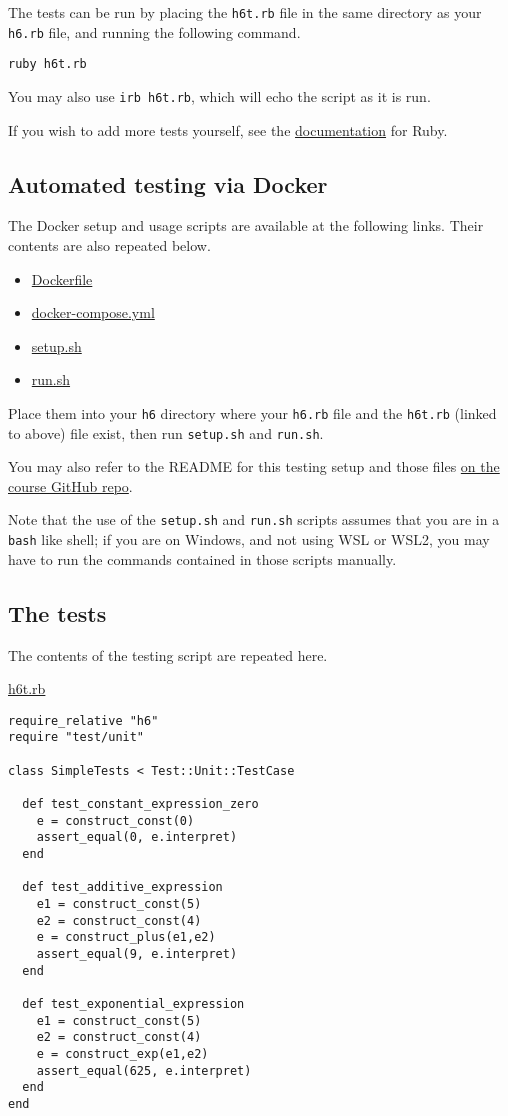 \documentclass[11pt]{article}
\begin{document}
The tests can be run by placing the \texttt{h6t.rb} file
in the same directory as your \texttt{h6.rb} file, and
running the following command.
\begin{verbatim}
ruby h6t.rb
\end{verbatim}
You may also use \texttt{irb h6t.rb}, which will echo the script
as it is run.

If you wish to add more tests yourself,
see the \href{https://en.wikibooks.org/wiki/Ruby\_Programming/Unit\_testing}{documentation}
for Ruby.

\subsection*{Automated testing via Docker}
\label{sec:orgc489eca}
The Docker setup and usage scripts are available at the following links.
Their contents are also repeated below.
\begin{itemize}
\item \href{./testing/h6/Dockerfile}{Dockerfile}
\item \href{./testing/h6/docker-compose.yml}{docker-compose.yml}
\item \href{./testing/h6/setup.sh}{setup.sh}
\item \href{./testing/h6/run.sh}{run.sh}
\end{itemize}
Place them into your \texttt{h6} directory where your \texttt{h6.rb} file
and the \texttt{h6t.rb} (linked to above) file exist,
then run \texttt{setup.sh} and \texttt{run.sh}.

You may also refer to the README
for this testing setup and those files
\href{https://github.com/armkeh/principles-of-programming-languages/tree/master/homework/testing/h5}{on the course GitHub repo}.

Note that the use of the \texttt{setup.sh} and \texttt{run.sh} scripts assumes
that you are in a \texttt{bash} like shell; if you are on Windows,
and not using WSL or WSL2, you may have
to run the commands contained in those scripts manually.

\subsection*{The tests}
\label{sec:org0ae1d54}
The contents of the testing script are repeated here.

\href{./testing/h6/h6t.rb}{h6t.rb}
\begin{verbatim}
require_relative "h6"
require "test/unit"

class SimpleTests < Test::Unit::TestCase

  def test_constant_expression_zero
    e = construct_const(0)
    assert_equal(0, e.interpret)
  end

  def test_additive_expression
    e1 = construct_const(5)
    e2 = construct_const(4)
    e = construct_plus(e1,e2)
    assert_equal(9, e.interpret)
  end

  def test_exponential_expression
    e1 = construct_const(5)
    e2 = construct_const(4)
    e = construct_exp(e1,e2)
    assert_equal(625, e.interpret)
  end
end
\end{verbatim}
\end{document}
